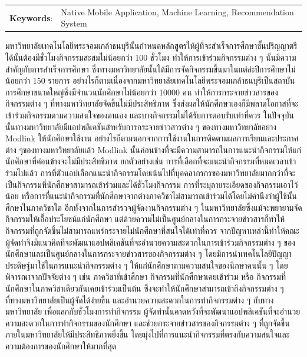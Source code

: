 \documentclass[14pt,oneside,openright,a4paper]{cpe-thai-project}
\begin{document}
\begin{flushleft}
\begin{tabular*}{\textwidth}{@{}lp{}}
\textbf{Keywords}: & Native Mobile Application, Machine Learning, Recommendation System
\end{tabular*}
\end{flushleft}
\endabstract


\thaiabstract
มหาวิทยาลัยเทคโนโลยีพระจอมเกล้าธนบุรีนั้นกำหนดหลักสูตรให้ผู้ที่จะสำเร็จการศึกษาชั้นปริญญาตรีได้นั้นต้องมีชั่วโมงกิจกรรมสะสมไม่น้อยกว่า 100 ชั่วโมง ทำให้การเข้าร่วมกิจกรรมต่าง ๆ นั้นมีความสำคัญกับการสำเร็จการศึกษา ซึ่งทางมหาวิทยาลัยนั้นได้มีการจัดกิจกรรมขึ้นมาในแต่ล่ะปีการศึกษาไม่น้อยกว่า 150 รายการ อย่างไรก็ตามเนื่องจากมหาวิทยาลัยเทคโนโลยีพระจอมเกล้าธนบุรีเป็นสถาบันการศึกษาขนาดใหญ่ซึ่งมีจำนวนนักศึกษาไม่น้อยกว่า 10000 คน ทำให้การกระจายข่าวสารของกิจกรรมต่าง ๆ ที่ทางมหาวิทยาลัยจัดขึ้นไม่มีประสิทธิภาพ ซึ่งส่งผลให้นักศึกษาเองก็มีพลาดโอกาสที่จะเข้าร่วมกิจกรรมตามความสนใจของตนเอง และบางกิจกรรมไม่ได้รับการตอบรับเท่าที่ควร
ในปัจจุบันนั้นทางมหาวิทยาลัยมีแอปพลิเคชันสำหรับการกระจายข่าวสารต่าง ๆ ของทางมหาวิทยาลัยอย่าง Modlink ให้นักศึกษาใช้งาน อย่างไรก็ตามนอกจากการใช้งานในการติดตามผลการเรียนและประกาศต่าง ๆของทางมหาวิทยาลัยแล้ว Modlink นั้นค่อนข้างที่จะมีความสามารถในการแนะนำกิจกรรมให้แก่นักศึกษาที่ค่อนข้างจะไม่มีประสิทธิภาพ ยกตัวอย่างเช่น การที่เลือกที่จะแนะนำกิจกรรมที่หมดเวลาเข้าร่วมไปแล้ว การที่ตัวแอปเลือกแนะนำกิจกรรมโดยเน้นไปที่บุคคลากรกรของมหาวิทยาลัยมากกว่าที่จะเป็นกิจกรรมที่นักศึกษาสามารถเข้าร่วมและได้ชั่วโมงกิจกรรม การที่ระบุลายระเอียดของกิจกรรมเอาไว้น้อย หรือการที่แนะนำกิจกรรมที่นักศึกษาจากต่างภาควิชาไม่สามารถเข้าร่วมได้โดยไม่คำนึงว่าผู้ใช้นั้นศึกษาในภาควิชาใด อีกทั้งจากในการสำรวจผู้จัดงานกิจกรรมต่าง ๆ ในมหาวิทยาลัยซึ่งแม้จะพยายามจัดกิจกรรมให้เอื้อประโยชน์แก่นักศึกษา แต่ด้วยความไม่เป็นศูนย์กลางในการกระจายข่าวสารก็ทำให้กิจกรรมที่ถูกจัดขึ้นไม่สามารถแพร่กระจายไม่นักศึกษาที่สนใจได้เท่าที่ควร จากปัญหาเหล่านี้ทำให้คณะผู้จัดทำจึงมีแนวคิดทีจะพัฒนาแอปพลิเคชันที่จะอำนวยความสะดวกในการเข้าร่วมกิจกรรมต่าง ๆ ของนักศึกษาและเป็นศูนย์กลางในการกระจายข่าวสารของกิจกรรมต่าง ๆ โดยมีการนำเทคโนโลยีปัญญาประดิษฐ์มาใช้ในการแนะนำกิจกรรมต่าง ๆ ให้แก่นักศึกษาตามความสนใจของนึกษาคนนั้น ๆ โดย พิจารณาจากปัจจัยต่าง ๆ เช่น  ภาควิชาที่เข้าศึกษา กิจกรรมที่นักศึกษาเคยเข้าร่วม หรือ กิจกรรมที่นักศึกษาในภาควิชาเดียวกันเคยเข้าร่วมเป็นต้น ซึ่งจะทำให้นักศึกษาสามารถเข้าถึงกิจกรรมต่าง ๆ ที่ทางมหาวิทยาลัยเป็นผู้จัดได้ง่ายขึ้น และอำนวยความสะดวกในการทำกิจกรรมต่าง ๆ กับทางมหาวิทยาลัย เพื่อแลกกับชั่วโมงการทำกิจกรรม
ผู้จัดทำนั้นคาดหวังที่จะพัฒนาแอปพลิเคชันที่จะอำนวยความสะดวกในการทำกิจกรรมของนักศึกษา และช่วยกระจายข่าวสารของกิจกรรมต่าง ๆ ที่ถูกจัดขึ้นภายในมหาวิทยาลัยให้มีประสิทธิภาพยิ่งขึ้น โดยมุ่งไปที่การแนะนำกิจกรรมที่ตรงกับความสนใจและความต้องการของนักศึกษาให้มากที่สุด 
\end{document}
